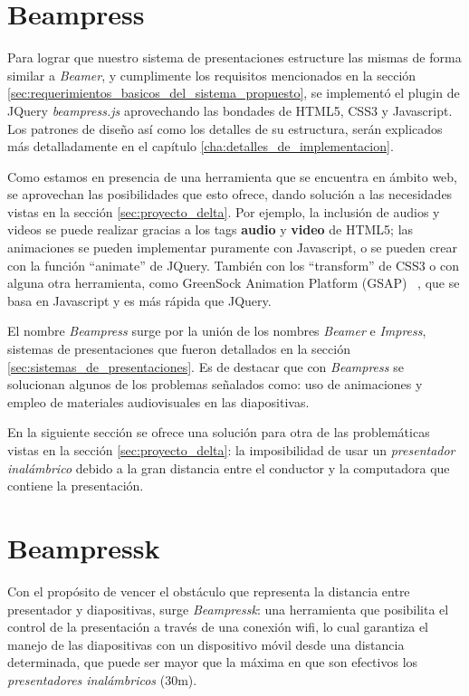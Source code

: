 	\section{Beampress} %
	\label{sec:beampress}
		Para lograr que nuestro sistema de presentaciones estructure las mismas de forma similar a \textit{Beamer}, y cumplimente los requisitos mencionados en la sección \ref{sec:requerimientos_basicos_del_sistema_propuesto}, se implementó el plugin de JQuery \textit{beampress.js} aprovechando las bondades de HTML5, CSS3 y Javascript. Los patrones de diseño así como los detalles de su estructura, serán explicados más detalladamente en el capítulo \ref{cha:detalles_de_implementacion}.


		Como estamos en presencia de una herramienta que se encuentra en ámbito web, se aprovechan las posibilidades que esto ofrece, dando solución a las necesidades vistas en la sección \ref{sec:proyecto_delta}. Por ejemplo, la inclusión de audios y videos se puede realizar gracias a los tags \textbf{audio} y \textbf{video} de HTML5; las animaciones se pueden implementar puramente con Javascript, o se pueden crear con la función ``animate'' de JQuery. También con los ``transform'' de CSS3 o con alguna otra herramienta, como GreenSock Animation Platform (GSAP) ~\cite{gsap}, que se basa en Javascript y es más rápida que JQuery. 


		El nombre \textit{Beampress} surge por la unión de los nombres \textit{Beamer} e \textit{Impress}, sistemas de presentaciones que fueron detallados en la sección \ref{sec:sistemas_de_presentaciones}. Es de destacar que con \textit{Beampress} se solucionan algunos de los problemas señalados como: uso de animaciones y empleo de materiales audiovisuales en las diapositivas.	

	En la siguiente sección se ofrece una solución para otra de las problemáticas vistas en la sección \ref{sec:proyecto_delta}: la imposibilidad de usar un \textit{presentador inalámbrico} debido a la gran distancia entre el conductor y la computadora que contiene la presentación.
	
	\section{Beampressk} %
	\label{sec:beampressk}
		Con el propósito de vencer el obstáculo que representa la distancia entre presentador y diapositivas, surge \textit{Beampressk}: una herramienta que posibilita el control de la presentación a través de una conexión wifi, lo cual garantiza el manejo de las diapositivas con un dispositivo móvil desde una distancia determinada, que puede ser mayor que la máxima en que son efectivos los \textit{presentadores inalámbricos} (30m).

